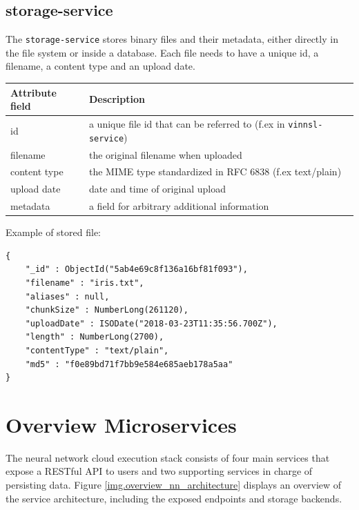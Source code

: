 \subsection{storage-service}\label{storage-service}

The \texttt{storage-service} stores binary files and their metadata,
either directly in the file system or inside a database. Each file needs
to have a unique id, a filename, a content type and an upload date.

\begin{longtable}[]{@{}ll@{}}
\toprule
Attribute field & Description\tabularnewline
\midrule
\endhead
id & a unique file id that can be referred to (f.ex in
\texttt{vinnsl-service})\tabularnewline
filename & the original filename when uploaded\tabularnewline
content type & the MIME type standardized in RFC 6838 (f.ex
text/plain)\tabularnewline
upload date & date and time of original upload\tabularnewline
metadata & a field for arbitrary additional information\tabularnewline
\bottomrule
\end{longtable}

Example of stored file:

\begin{verbatim}
{
    "_id" : ObjectId("5ab4e69c8f136a16bf81f093"),
    "filename" : "iris.txt",
    "aliases" : null,
    "chunkSize" : NumberLong(261120),
    "uploadDate" : ISODate("2018-03-23T11:35:56.700Z"),
    "length" : NumberLong(2700),
    "contentType" : "text/plain",
    "md5" : "f0e89bd71f7bb9e584e685aeb178a5aa"
}
\end{verbatim}

\section{Overview Microservices}\label{overview-microservices}

The neural network cloud execution stack consists of four main services
that expose a RESTful API to users and two supporting services in charge
of persisting data. Figure \ref{img.overview_nn_architecture} displays
an overview of the service architecture, including the exposed endpoints
and storage backends.

